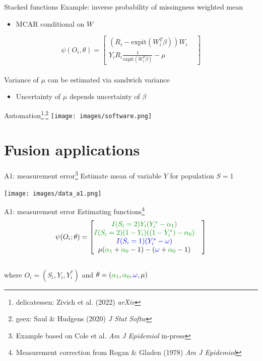 \documentclass{beamer}
\newcommand{\blue}[1]{\textcolor{blue}{#1}}
\newcommand{\green}[1]{\textcolor{ForestGreen}{#1}}
\begin{document}
\begin{frame}{Stacked functions}
	Example: inverse probability of missingness weighted mean
	\begin{itemize}
		\item MCAR conditional on $W$ 
	\end{itemize}
	\[\psi(O_i, \theta) = 
	\begin{bmatrix}
		\left(R_i - \text{expit}(W_i^T \beta)\right) W_i & \\
		Y_i R_i \frac{1}{\text{expit}(W_i^T \beta)} - \mu & 
	\end{bmatrix}\]~\\
	Variance of $\mu$ can be estimated via sandwich variance
	\begin{itemize}
		\item Uncertainty of $\mu$ depends uncertainty of $\beta$
	\end{itemize}
\end{frame}

\begin{frame}{Automation\footnote[frame]{delicatessen: Zivich et al. (2022) \textit{arXiv}}\textsuperscript{,}\footnote[frame]{geex: Saul \& Hudgens (2020) \textit{J Stat Softw}}}
	\centering
	\texttt{[image: images/software.png]}	
\end{frame}

\section{Fusion applications}

\begin{frame}{A1: measurement error\footnote[frame]{Example based on Cole et al. \textit{Am J Epidemiol} in-press}}
	Estimate mean of variable $Y$ for population $S=1$
	\begin{center}
		\texttt{[image: images/data\_a1.png]}
	\end{center}
\end{frame}

\begin{frame}{A1: measurement error}
	Estimating functions\footnote[frame]{Measurement correction from Rogan \& Gladen (1978) \textit{Am J Epidemiol}}
	\[\psi(O_i; \theta) = 
	\begin{bmatrix}
		\green{I(S_i = 2) Y_i (Y_i^* - \alpha_1)} & \\
		\green{I(S_i = 2) (1-Y_i) (\left(1-Y_i^*) - \alpha_0\right)} & \\
		\blue{I(S_i = 1) (Y_i^* - \omega)} & \\
		\mu(\green{\alpha_1} + \green{\alpha_0} - 1) - (\blue{\omega} + \green{\alpha_0} - 1)		
	\end{bmatrix}\]~\\
	where $O_i = (S_i, Y_i, Y_i^*)$ and $\theta = (\green{\alpha_1}, \green{\alpha_0}, \blue{\omega}, \mu)$
\end{frame}
\end{document}
